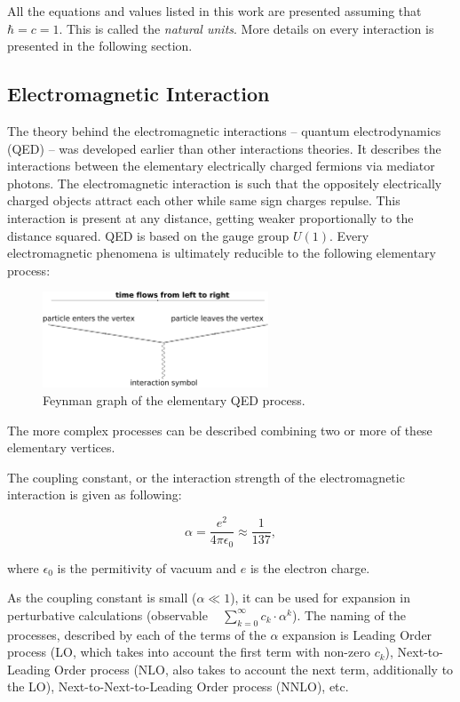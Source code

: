 All the equations and values listed in this work are presented assuming that $\hbar = c = 1$. This is called the \textit{natural units}. 
More details on every interaction is presented in the following section.

\subsection{Electromagnetic Interaction}

The theory behind the electromagnetic interactions -- quantum electrodynamics (QED) \cite{PhysRev.75.486} -- was developed earlier than other 
interactions theories. It describes the interactions between the elementary electrically charged fermions via mediator photons.
The electromagnetic interaction is such that the oppositely electrically charged objects attract each other while same sign charges repulse.
This interaction is present at any distance, getting weaker proportionally to the distance squared. QED is based on the gauge group $U(1)$.
Every electromagnetic phenomena is ultimately reducible to the following elementary process:

\begin{figure}[h]
  \centering
  \includegraphics[width=0.6\textwidth]{01_Theory_SM/plots/QED_simple_uniform.png}
  \caption{Feynman graph of the elementary QED process.}
  \label{fig:QED_simple}
\end{figure}

The more complex processes can be described combining two or more of these elementary vertices.

The coupling constant, or the interaction strength of the electromagnetic interaction is given as following:

\begin{equation}
 \alpha = \frac{e^{2}}{4\pi\epsilon_{0}} \approx \frac{1}{137},
\end{equation}

where $\epsilon_{0}$ is the permitivity of vacuum and $e$ is the electron charge.

As the coupling constant is small ($\alpha \ll 1$), it can be used for expansion in perturbative calculations (observable ~ $\sum_{k=0}^{\infty} c_{k}\cdot\alpha^{k}$).
The naming of the processes, described by each of the terms of the $\alpha$ expansion
is Leading Order process (LO, which takes into account the first term with non-zero $c_{k}$), Next-to-Leading Order process (NLO, also takes
to account the next term, additionally to the LO), Next-to-Next-to-Leading Order process (NNLO), etc.

